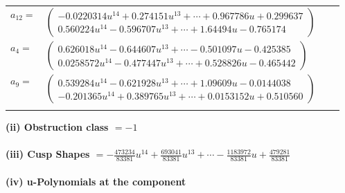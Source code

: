 \documentclass[1p]{elsarticle_modified}
\theoremstyle{definition}
\begin{document}
\begin{tabular}{m{7pt} m{180pt} m{7pt} m{180pt} }
\flushright $a_{12}=$&$\begin{pmatrix}-0.0220314 u^{14}+0.274151 u^{13}+\cdots+0.967786 u+0.299637\\0.560224 u^{14}-0.596707 u^{13}+\cdots+1.64494 u-0.765174\end{pmatrix}$ \\
\flushright $a_{4}=$&$\begin{pmatrix}0.626018 u^{14}-0.644607 u^{13}+\cdots-0.501097 u-0.425385\\0.0258572 u^{14}-0.477447 u^{13}+\cdots+0.528826 u-0.465442\end{pmatrix}$ \\
\flushright $a_{9}=$&$\begin{pmatrix}0.539284 u^{14}-0.621928 u^{13}+\cdots+1.09609 u-0.0144038\\-0.201365 u^{14}+0.389765 u^{13}+\cdots+0.0153152 u+0.510560\end{pmatrix}$\\&\end{tabular}
\flushleft \textbf{(ii) Obstruction class $= -1$}\\~\\
\flushleft \textbf{(iii) Cusp Shapes $= -\frac{473234}{83381} u^{14}+\frac{693041}{83381} u^{13}+\cdots-\frac{1183972}{83381} u+\frac{479281}{83381}$}\\~\\
\newpage\renewcommand{\arraystretch}{1}
\flushleft \textbf{(iv) u-Polynomials at the component}\newline \\
\end{document}
